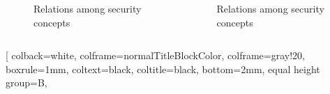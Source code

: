 \documentclass{beamer}
\begin{document}
\begin{frame}[fragile]{}
\begin{columns}[T]
\begin{column}{.495\textwidth}
\begin{tcolorbox}[adjusted title={\centering\large Security concepts}, equal height group=K]
                \vspace{-1.8em}
                \begin{columns}[c]
                    \begin{column}{.49\textwidth}
                        \begin{figure}[htb]
                            \resizebox{1.1\columnwidth}{!}{
                                
                            }
                            \vspace{-1.4cm}
                            \caption{Relations among security concepts}
                        \end{figure}
                    \end{column}
                    \begin{column}{.49\textwidth}
                        \begin{figure}[htb]
                            \vspace{-1em}
                            \resizebox{1.1\columnwidth}{!}{
                                
                            }
                            \vspace{-2.5cm}
                            \caption{Relations among security concepts}
                        \end{figure}
                    \end{column}
                \end{columns}
            \end{tcolorbox}
        \end{column}
    \end{columns}
    \vspace{.25em}
    \begin{tcolorbox}[adjusted title={\centering\large Formal Analysis of Industrial Protocols}]
        \vspace{.5em}
        \begin{columns}[T]
            \begin{column}{.35\textwidth}
                \begin{tcolorbox}[
                colback=white, %
                colframe=normalTitleBlockColor, %
                colframe=gray!20, %
                boxrule=1mm,
                coltext=black, %
                coltitle=black, %
                bottom=2mm,
                equal height group=B,

\end{tcolorbox}
\end{column}
\end{columns}
\end{tcolorbox}
\end{frame}
\end{document}
